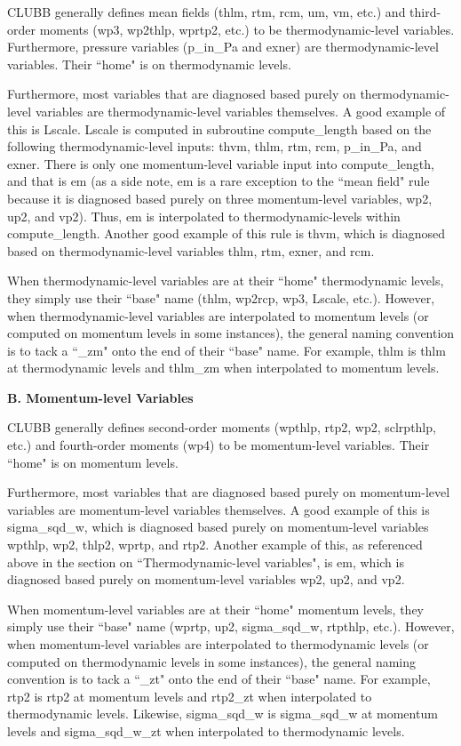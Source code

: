 \documentclass[letterpaper,12pt]{article}
\begin{document}
\begin{enumerate}
  CLUBB generally defines mean fields (thlm, rtm, rcm, um, vm, etc.) and
  third-order moments (wp3, wp2thlp, wprtp2, etc.) to be thermodynamic-level
  variables. Furthermore, pressure variables (p\_in\_Pa and exner) are
  thermodynamic-level variables. Their ``home" is on thermodynamic levels.

  Furthermore, most variables that are diagnosed based purely on
  thermodynamic-level variables are thermodynamic-level variables themselves.  A
  good example of this is Lscale. Lscale is computed in subroutine
  compute\_length based on the following thermodynamic-level inputs:  thvm,
  thlm, rtm, rcm, p\_in\_Pa, and exner.  There is only one momentum-level
  variable input into compute\_length, and that is em (as a side note, em is a
  rare exception to the ``mean field" rule because it is diagnosed based purely
  on three momentum-level variables, wp2, up2, and vp2).  Thus, em is
  interpolated to thermodynamic-levels within compute\_length. Another good
  example of this rule is thvm, which is diagnosed based on thermodynamic-level
  variables thlm, rtm, exner, and rcm.

  When thermodynamic-level variables are at their ``home" thermodynamic levels,
  they simply use their ``base" name (thlm, wp2rcp, wp3, Lscale, etc.). However,
  when thermodynamic-level variables are interpolated to momentum levels (or
  computed on momentum levels in some instances), the general naming convention
  is to tack a ``\_zm" onto the end of their ``base" name. For example, thlm is
  thlm at thermodynamic levels and thlm\_zm when interpolated to momentum
  levels.

  {\bf B. Momentum-level Variables}

  CLUBB generally defines second-order moments (wpthlp, rtp2, wp2, sclrpthlp,
  etc.) and fourth-order moments (wp4) to be momentum-level variables.  Their
  ``home" is on momentum levels.

  Furthermore, most variables that are diagnosed based purely on momentum-level
  variables are momentum-level variables themselves.  A good example of this is
  sigma\_sqd\_w, which is diagnosed based purely on momentum-level variables
  wpthlp, wp2, thlp2, wprtp, and rtp2.  Another example of this, as referenced
  above in the section on ``Thermodynamic-level variables", is em, which is
  diagnosed based purely on momentum-level variables wp2, up2, and vp2.

  When momentum-level variables are at their ``home" momentum levels, they
  simply use their ``base" name (wprtp, up2, sigma\_sqd\_w, rtpthlp, etc.).
  However, when momentum-level variables are interpolated to thermodynamic
  levels (or computed on thermodynamic levels in some instances), the general
  naming convention is to tack a ``\_zt" onto the end of their ``base" name.
  For example, rtp2 is rtp2 at momentum levels and rtp2\_zt when interpolated to
  thermodynamic levels.  Likewise, sigma\_sqd\_w is sigma\_sqd\_w at momentum
  levels and sigma\_sqd\_w\_zt when interpolated to thermodynamic levels.


\end{enumerate}
\end{document}
